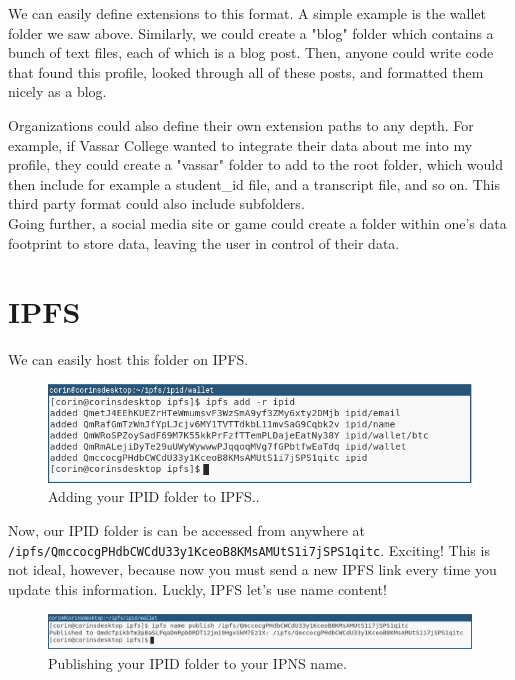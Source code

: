 \documentclass{article}
\begin{document}
We can easily define extensions to this format. A simple example is the wallet folder we saw above. Similarly, we could create a "blog" folder which contains a bunch of text files, each of which is a blog post. Then, anyone could write code that found this profile, looked through all of these posts, and formatted them nicely as a blog. \par
Organizations could also define their own extension paths to any depth. For example, if Vassar College wanted to integrate their data about me into my profile, they could create a "vassar" folder to add to the root folder, which would then include for example a student\_id file, and a transcript file, and so on. This third party format could also include subfolders. \\
Going further, a social media site or game could create a folder within one's data footprint to store data, leaving the user in control of their data. 

\section{IPFS}

We can easily host this folder on IPFS.

\begin{figure}[h]
  \centering
  \includegraphics[width=.9\textwidth]{resources/profile_to_ipfs.png}
  \caption{Adding your IPID folder to IPFS..}
\end{figure}

Now, our IPID folder is can be accessed from anywhere at \\
  \texttt{/ipfs/QmccocgPHdbCWCdU33y1KceoB8KMsAMUtS1i7jSPS1qitc}. Exciting! 
This is not ideal, however, because now you must send a new IPFS link every time you update this information. Luckly, IPFS let's use name content! 

\begin{figure}[h]
  \hspace*{-2cm}
  \centering
  \includegraphics[width=.75\paperwidth]{resources/publish_profile.png}
  \caption{Publishing your IPID folder to your IPNS name.}
\end{figure}
\end{document}
